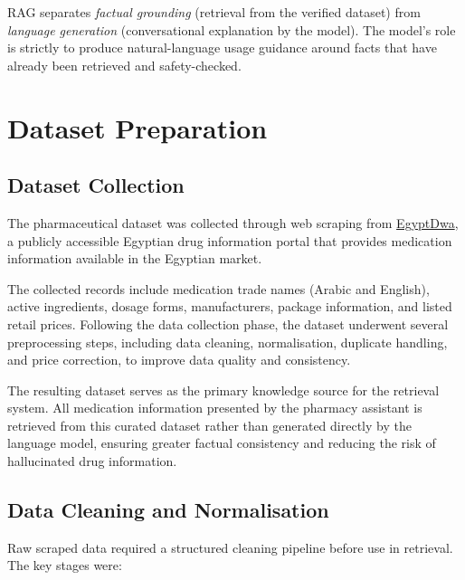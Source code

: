 \documentclass[12pt,a4paper]{article}
\begin{document}
RAG separates \emph{factual grounding} (retrieval from the verified dataset)
from \emph{language generation} (conversational explanation by the model).
The model's role is strictly to produce natural-language usage guidance
around facts that have already been retrieved and safety-checked.

\section{Dataset Preparation}

\subsection{Dataset Collection}

The pharmaceutical dataset was collected through web scraping from
\href{https://egyptdwa.com/}{EgyptDwa}, a publicly accessible Egyptian drug
information portal that provides medication information available in the
Egyptian market.

The collected records include medication trade names (Arabic and English),
active ingredients, dosage forms, manufacturers, package information, and
listed retail prices. Following the data collection phase, the dataset
underwent several preprocessing steps, including data cleaning, normalisation,
duplicate handling, and price correction, to improve data quality and
consistency.

The resulting dataset serves as the primary knowledge source for the retrieval
system. All medication information presented by the pharmacy assistant is
retrieved from this curated dataset rather than generated directly by the
language model, ensuring greater factual consistency and reducing the risk of
hallucinated drug information.

\subsection{Data Cleaning and Normalisation}

Raw scraped data required a structured cleaning pipeline before use in
retrieval. The key stages were:
\end{document}
